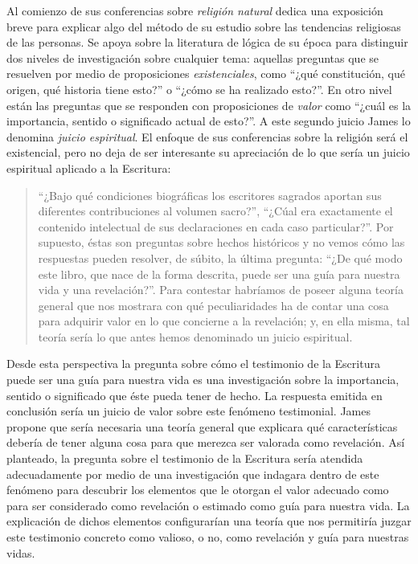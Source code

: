 Al comienzo de sus conferencias sobre \emph{religión natural} dedica una
exposición breve para explicar algo del método de su estudio sobre las
tendencias religiosas de las personas. Se apoya sobre la literatura de lógica de
su época para distinguir dos niveles de investigación sobre cualquier tema:
aquellas preguntas que se resuelven por medio de proposiciones
\emph{existenciales}, como \enquote{¿qué constitución, qué origen, qué historia
  tiene esto?} o \enquote{¿cómo se ha realizado esto?}. En otro nivel están las
preguntas que se responden con proposiciones de \emph{valor} como \enquote{¿cuál
  es la importancia, sentido o significado actual de esto?}. A este segundo
juicio James lo denomina \emph{juicio espiritual}. El enfoque de sus
conferencias sobre la religión será el existencial, pero no deja de ser
interesante su apreciación de lo que sería un juicio espiritual aplicado a la
Escritura:

\blockquote[{\cite[27]{james2002variedades}}]{\enquote{¿Bajo qué condiciones
    biográficas los escritores sagrados aportan sus diferentes contribuciones al
    volumen sacro?}, \enquote{¿Cúal era exactamente el contenido intelectual de
    sus declaraciones en cada caso particular?}. Por supuesto, éstas son
  preguntas sobre hechos históricos y no vemos cómo las respuestas pueden
  resolver, de súbito, la última pregunta: \enquote{¿De qué modo este libro, que
    nace de la forma descrita, puede ser una guía para nuestra vida y una
    revelación?}. Para contestar habríamos de poseer alguna teoría general que
  nos mostrara con qué peculiaridades ha de contar una cosa para adquirir valor
  en lo que concierne a la revelación; y, en ella misma, tal teoría sería lo que
  antes hemos denominado un juicio espiritual.}

Desde esta perspectiva la pregunta sobre cómo el testimonio de la Escritura
puede ser una guía para nuestra vida es una investigación sobre la importancia,
sentido o significado que éste pueda tener de hecho. La respuesta emitida en
conclusión sería un juicio de valor sobre este fenómeno testimonial. James
propone que sería necesaria una teoría general que explicara qué características
debería de tener alguna cosa para que merezca ser valorada como revelación. Así
planteado, la pregunta sobre el testimonio de la Escritura sería atendida
adecuadamente por medio de una investigación que indagara dentro de este
fenómeno para descubrir los elementos que le otorgan el valor adecuado como para
ser considerado como revelación o estimado como guía para nuestra vida. La
explicación de dichos elementos configurarían una teoría que nos permitiría
juzgar este testimonio concreto como valioso, o no, como revelación y guía para
nuestras vidas.

